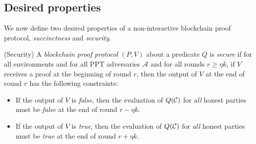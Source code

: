 \subsection{Desired properties}

We now define two desired properties of a non-interactive blockchain proof
protocol, \emph{succinctness} and \emph{security}.

\begin{definition}{(Security)}
A \emph{blockchain proof protocol} $(P, V)$ about a predicate $Q$ is
\emph{secure} if for all environments and for all PPT adversaries
$\mathcal{A}$ and for all rounds $r \geq \eta k$, if $V$ receives a proof at the
beginning of round $r$, then the output of $V$ at the end of round $r$ has the
following constraints:
\begin{itemize}
  \item If the output of $V$ is \emph{false}, then the evaluation of $Q(\mathcal{C})$
        for \emph{all} honest parties must be \emph{false} at the end of round
        $r - \eta k$.
  \item If the output of $V$ is \emph{true}, then the evaluation of $Q(\mathcal{C})$
        for \emph{all} honest parties must be \emph{true} at the end of round
        $r + \eta k$.
\end{itemize}
\end{definition}

